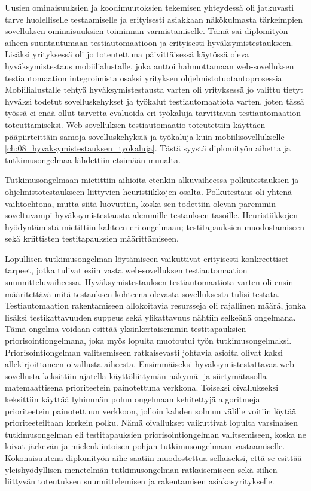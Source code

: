   Uusien ominaisuuksien ja koodimuutoksien tekemisen yhteydessä oli jatkuvasti tarve huolelliselle testaamiselle ja erityisesti asiakkaan näkökulmasta tärkeimpien sovelluksen ominaisuuksien toiminnan varmistamiselle.
  Tämä sai diplomityön aiheen suuntautumaan testiautomaatioon ja erityisesti hyväksymistestaukseen.
  Lisäksi yrityksessä oli jo toteutettuna päivittäisessä käytössä oleva hyväksymistestaus mobiilialustalle, joka auttoi hahmottamaan web-sovelluksen testiautomaation integroimista osaksi yrityksen ohjelmistotuotantoprosessia.
  Mobiilialustalle tehtyä hyväksymistestausta varten oli yrityksessä jo valittu tietyt hyväksi todetut sovelluskehykset ja työkalut testiautomaatiota varten, joten tässä työssä ei enää ollut tarvetta evaluoida eri työkaluja tarvittavan testiautomaation toteuttamiseksi.
  Web-sovelluksen testiautomaatio toteutettiin käyttäen pääpiirteittäin samoja sovelluskehyksiä ja työkaluja kuin mobiilisovellukselle \ref{ch:08_hyvaksymistestauksen_tyokaluja}.
  Tästä syystä diplomityön aihetta ja tutkimusongelmaa lähdettiin etsimään muualta.

  Tutkimusongelmaan mietittiin aihioita etenkin alkuvaiheessa polkutestauksen ja ohjelmistotestaukseen liittyvien heuristiikkojen osalta.
  Polkutestaus oli yhtenä vaihtoehtona, mutta siitä luovuttiin, koska sen todettiin olevan paremmin soveltuvampi hyväksymistestausta alemmille testauksen tasoille.
  Heuristiikkojen hyödyntämistä mietittiin kahteen eri ongelmaan; testitapauksien muodostamiseen sekä kriittisten testitapauksien määrittämiseen.

  Lopullisen tutkimusongelman löytämiseen vaikuttivat erityisesti konkreettiset tarpeet, jotka tulivat esiin vasta web-sovelluksen testiautomaation suunnitteluvaiheessa.
  Hyväksymistestauksen testiautomaatiota varten oli ensin määritettävä mitä testauksen kohteena olevasta sovelluksesta tulisi testata.
  Testiautomaation rakentamiseen allokoitavia resursseja oli rajallinen määrä, jonka lisäksi testikattavuuden suppeus sekä ylikattavuus nähtiin selkeänä ongelmana.
  Tämä ongelma voidaan esittää yksinkertaisemmin testitapauksien priorisointiongelmana, joka myös lopulta muotoutui työn tutkimusongelmaksi.
  Priorisointiongelman valitsemiseen ratkaisevasti johtavia asioita olivat kaksi allekirjoittaneen oivallusta aiheesta.
  Ensimmäiseksi hyväksymistestattavaa web-sovellusta keksittiin ajatella käyttöliittymän näkymä- ja siirtymätasolla matemaattisena prioriteetein painotettuna verkkona.
  Toiseksi oivallukseksi keksittiin käyttää lyhimmän polun ongelmaan kehitettyjä algoritmeja prioriteetein painotettuun verkkoon, jolloin kahden solmun välille voitiin löytää prioriteeteiltaan korkein polku.
  Nämä oivallukset vaikuttivat lopulta varsinaisen tutkimusongelman eli testitapauksien priorisointiongelman valitsemiseen, koska ne loivat järkevän ja mielenkiintoisen pohjan tutkimusongelmaan vastaamiselle.
  Kokonaisuutena diplomityön aihe saatiin muodostettua sellaiseksi, että se esittää yleishyödyllisen menetelmän tutkimusongelman ratkaisemiseen sekä siihen liittyvän toteutuksen suunnittelemisen ja rakentamisen asiakasyritykselle.


